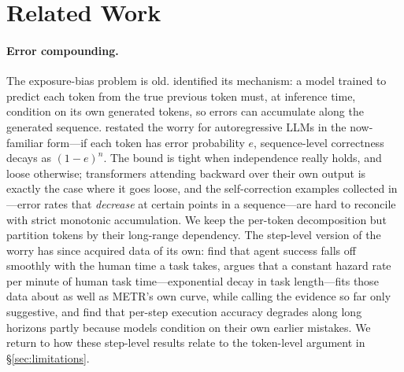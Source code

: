 \section{Related Work}
\label{sec:related}

\paragraph{Error compounding.}
The exposure-bias problem is old. \citet{bengio2015scheduled} identified its mechanism: a model trained to predict each token from the true previous token must, at inference time, condition on its own generated tokens, so errors can accumulate along the generated sequence. \citet{lecun2023why} restated the worry for autoregressive LLMs in the now-familiar form---if each token has error probability $e$, sequence-level correctness decays as $(1-e)^n$. The bound is tight when independence really holds, and loose otherwise; transformers attending backward over their own output is exactly the case where it goes loose, and the self-correction examples collected in \citet{gwern2023inner}---error rates that \emph{decrease} at certain points in a sequence---are hard to reconcile with strict monotonic accumulation. We keep the per-token decomposition but partition tokens by their long-range dependency. The step-level version of the worry has since acquired data of its own: \citet{kwa2025measuring} find that agent success falls off smoothly with the human time a task takes, \citet{ord2025halflife} argues that a constant hazard rate per minute of human task time---exponential decay in task length---fits those data about as well as METR's own curve, while calling the evidence so far only suggestive, and \citet{sinha2025illusion} find that per-step execution accuracy degrades along long horizons partly because models condition on their own earlier mistakes. We return to how these step-level results relate to the token-level argument in \S\ref{sec:limitations}.


